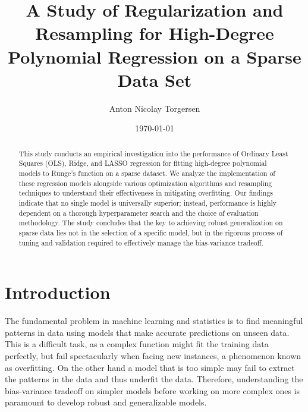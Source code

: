 \documentclass[twocolumn,aps]{revtex4}
\begin{document}
\title{A Study of Regularization and Resampling for High-Degree Polynomial Regression on a Sparse Data Set}
\date{\today}               
\author{
    Anton Nicolay Torgersen 
}


\newpage



    \begin{abstract}
This study conducts an empirical investigation into the performance of Ordinary Least Squares (OLS), Ridge, and LASSO regression for fitting high-degree polynomial models to Runge's function on a sparse dataset. 
We analyze the implementation of these regression models alongside various optimization algorithms and resampling techniques to understand their effectiveness in mitigating overfitting. 
Our findings indicate that no single model is universally superior; instead, performance is highly dependent on a thorough hyperparameter search and the choice of evaluation methodology. 
The study concludes that the key to achieving robust generalization on sparse data lies not in the selection of a specific model, but in the rigorous process of tuning and validation required to effectively manage the bias-variance tradeoff.
\end{abstract}


    \maketitle
    \thispagestyle{empty} %

    


\section{Introduction}

The fundamental problem in machine learning and statistics is to find meaningful patterns in data using models that make accurate predictions on unseen data.
This is a difficult task, as a complex function might fit the training data perfectly, but fail spectacularly when facing new instances, a phenomenon known as overfitting.
On the other hand a model that is too simple may fail to extract the patterns in the data and thus underfit the data.
Therefore, understanding the bias-variance tradeoff on simpler models before working on more complex ones is paramount to develop robust and generalizable models.
\end{document}
